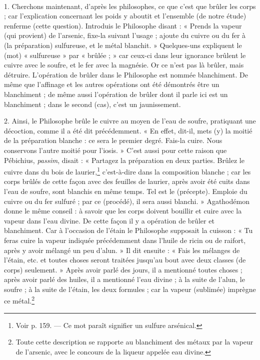 \documentclass[landscape, a4paper, 11pt, oneside, polutonikogreek, french]{article}
\begin{document}
\paragraph{}
1. Cherchons maintenant, d'après les philosophes, ce que c'est que brûler les corps ; car l'explication concernant les poids y aboutit et l'ensemble (de notre étude) renferme (cette question). Introduis le Philosophe disant : « Prends la vapeur (qui provient) de l'arsenic, fixe-la suivant l'usage ; ajoute du cuivre ou du fer à (la préparation) sulfureuse, et le métal blanchit. » Quelques-uns expliquent le (mot) « sulfureuse » par « brûlée ; » car ceux-ci dans leur ignorance brûlent le cuivre avec le soufre, et le fer avec la magnésie. Or ce n'est pas là brûler, mais détruire. L'opération de brûler dans le Philosophe est nommée blanchiment. De même que l'affinage et les autres opérations ont été démontrés être un blanchiment ; de même aussi l'opération de brûler dont il parle ici est un blanchiment ; dans le second (cas), c'est un jaunissement.

2. Ainsi, le Philosophe brûle le cuivre au moyen de l'eau de soufre, pratiquant une décoction, comme il a été dit précédemment. « En effet, dit-il, mets (y) la moitié de la préparation blanche : ce sera le premier degré. Fais-la cuire. Nous conservons l'autre moitié pour l'iosis. » C'est aussi pour cette raison que Pébichius, \emph{passim}, disait : « Partagez la préparation en deux parties. Brûlez le cuivre dans du bois de laurier,\footnote{Voir p. 159. --- Ce mot paraît signifier un sulfure arsénical.} c'est-à-dire dans la composition blanche ; car les corps brûlés de cette façon avec des feuilles de laurier, après avoir été cuits dans l'eau de soufre, sont blanchis en même temps. Tel est le (précepte). Emploie du cuivre ou du fer sulfuré ; par ce (procédé), il sera aussi blanchi. » Agathodémon donne le même conseil : à savoir que les corps doivent bouillir et cuire avec la vapeur dans l'eau divine. De cette façon il y a opération de brûler et blanchiment. Car à l'occasion de l'étain le Philosophe supposait la cuisson : « Tu feras cuire la vapeur indiquée précédemment dans l'huile de ricin ou de raifort, après y avoir mélangé un peu d'alun. » Il dit ensuite : « Fais les mélanges de l'étain, etc. et toutes choses seront traitées jusqu'au bout avec deux classes (de corps) seulement. » Après avoir parlé des jours, il a mentionné toutes choses ; après avoir parlé des huiles, il a mentionné l'eau divine ; à la suite de l'alun, le soufre ; à la suite de l'étain, les deux formules ; car la vapeur (sublimée) imprègne ce métal.\footnote{Toute cette description se rapporte au blanchiment des métaux par la vapeur de l'arsenic, avec le concours de la liqueur appelée eau divine.}
\end{document}

